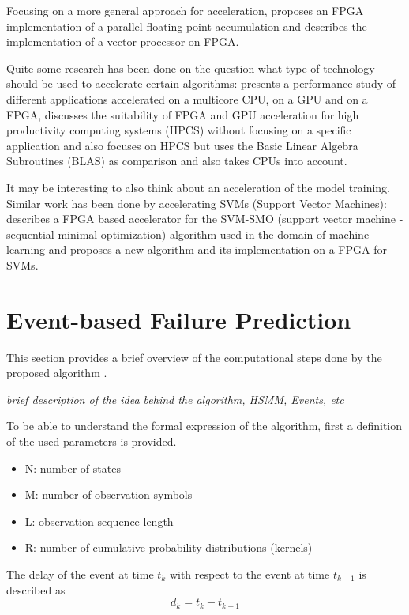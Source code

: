 \documentclass[mscthesis]{usiinfthesis}
\begin{document}
Focusing on a more general approach for acceleration, \cite{ARITH13_Kadric}
proposes an FPGA implementation of a parallel floating point accumulation and
\cite{ITNG07_Hongyan} describes the implementation of a vector processor on
FPGA.

Quite some research has been done on the question what type of technology
should be used to accelerate certain algorithms: \cite{SASP08_Che} presents
a performance study of different applications accelerated on a multicore CPU,
on a GPU and on a FPGA, \cite{FPL10_Jones} discusses the suitability of FPGA
and GPU acceleration for high productivity computing systems (HPCS) without
focusing on a specific application and \cite{ISVLSI10_Kestur} also focuses on
HPCS but uses the Basic Linear Algebra Subroutines (BLAS) as comparison and
also takes CPUs into account.

It may be interesting to also think about an acceleration of the model
training. Similar work has been done by accelerating SVMs (Support Vector Machines):
\cite{FCCM09_Cadambi} describes a FPGA based accelerator for the SVM-SMO
(support vector machine - sequential minimal optimization) algorithm used in
the domain of machine learning and \cite{IEEE03_Anguita} proposes a new algorithm
and its implementation on a FPGA for SVMs.

\chapter{Event-based Failure Prediction}
\label{ch:event}

This section provides a brief overview of the computational steps done by the
proposed algorithm \cite{salfner08}.

\emph{\color{red}brief description of the idea behind the algorithm, HSMM, Events, etc}

To be able to understand the formal expression of the algorithm, first
a definition of the used parameters is provided.
\begin{itemize}
    \item N: number of states
    \item M: number of observation symbols
    \item L: observation sequence length
    \item R: number of cumulative probability distributions (kernels)
\end{itemize}
The delay of the event at time $ t_k $ with respect to the event at time
$ t_{k-1} $ is described as
\begin{equation}
    d_k = t_k-t_{k-1}
\end{equation}
\end{document}
